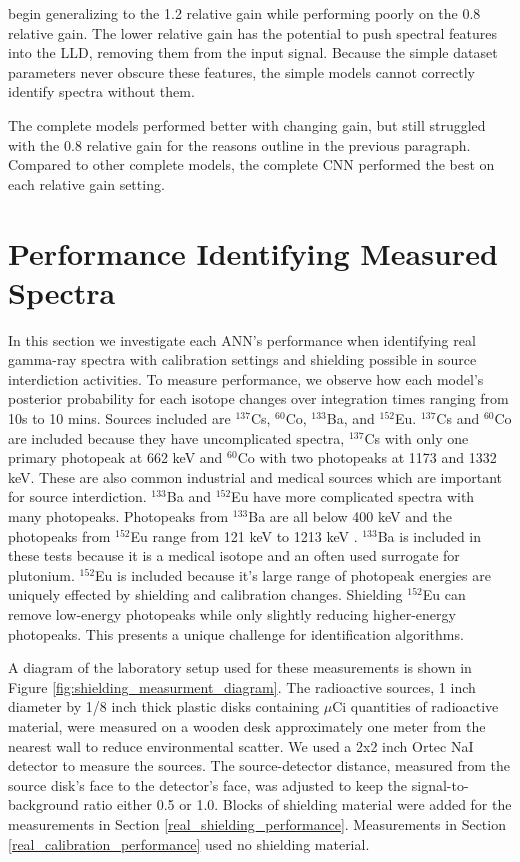 begin generalizing to the 1.2 relative gain while performing poorly on the 0.8 relative gain. The lower relative gain has the potential to push spectral features into the LLD, removing them from the input signal. Because the simple dataset parameters never obscure these features, the simple models cannot correctly identify spectra without them.

The complete models performed better with changing gain, but still struggled with the 0.8 relative gain for the reasons outline in the previous paragraph. Compared to other complete models, the complete CNN performed the best on each relative gain setting.

\section{Performance Identifying Measured Spectra} \label{real_spectra_performance}

In this section we investigate each ANN's performance when identifying real gamma-ray spectra with calibration settings and shielding possible in source interdiction activities. To measure performance, we observe how each model's posterior probability for each isotope changes over integration times ranging from 10s to 10 mins. Sources included are $^{137}$Cs, $^{60}$Co, $^{133}$Ba, and $^{152}$Eu. $^{137}$Cs and $^{60}$Co are included because they have uncomplicated spectra, $^{137}$Cs with only one primary photopeak at 662 keV and $^{60}$Co with two photopeaks at 1173 and 1332 keV. These are also common industrial and medical sources which are important for source interdiction. $^{133}$Ba and $^{152}$Eu have more complicated spectra with many photopeaks. Photopeaks from $^{133}$Ba are all below 400 keV and the photopeaks from $^{152}$Eu range from 121 keV to 1213 keV \cite{bigbluebook}. $^{133}$Ba is included in these tests because it is a medical isotope and an often used surrogate for plutonium. $^{152}$Eu is included because it's large range of photopeak energies are uniquely effected by shielding and calibration changes. Shielding $^{152}$Eu can remove low-energy photopeaks while only slightly reducing higher-energy photopeaks. This presents a unique challenge for identification algorithms.

A diagram of the laboratory setup used for these measurements is shown in Figure \ref{fig:shielding_measurment_diagram}. The radioactive sources, 1 inch diameter by 1/8 inch thick plastic disks containing $\mu$Ci quantities of radioactive material, were measured on a wooden desk approximately one meter from the nearest wall to reduce environmental scatter. We used a 2x2 inch Ortec NaI detector to measure the sources. The source-detector distance, measured from the source disk's face to the detector's face, was adjusted to keep the signal-to-background ratio either 0.5 or 1.0. Blocks of shielding material were added for the measurements in Section \ref{real_shielding_performance}. Measurements in Section \ref{real_calibration_performance} used no shielding material. 


